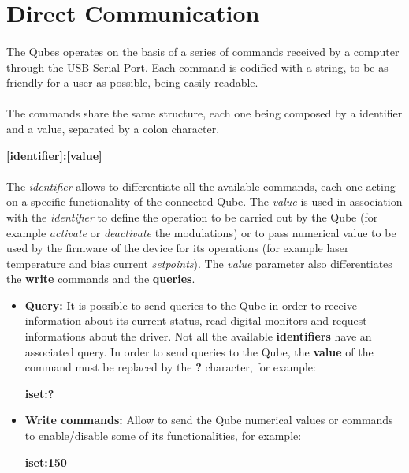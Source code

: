 \section{Direct Communication}  \label{commands_table_chapter}

\paragraph{} The Qubes operates on the basis of a series of commands received by a computer through the USB Serial Port. Each command is codified with a string, to be as friendly for a user as possible, being easily readable.

\paragraph{} The commands share the same structure, each one being composed by a identifier and a value, separated by a colon character.
\newline
    \begin{center}
        \textbf{[identifier]:[value]}
    \end{center}

\paragraph{} The \textit{identifier} allows to differentiate all the available commands, each one acting on a specific functionality of the connected Qube. The \textit{value} is used in association with the \textit{identifier} to define the operation to be carried out by the Qube (for example \textit{activate} or \textit{deactivate} the modulations) or to pass numerical value to be used by the firmware of the device for its operations (for example laser temperature and bias current \textit{setpoints}). The \textit{value} parameter also differentiates the \textbf{write} commands and the \textbf{queries}.

\begin{itemize}
    \item \textbf{Query:} It is possible to send queries to the Qube in order to receive information about its current status, read digital monitors and request informations about the driver. Not all the available \textbf{identifiers} have an associated query.
    \newline In order to send queries to the Qube, the \textbf{value} of the command must be replaced by the \textbf{?} character, for example:
        \begin{center}
            \textbf{iset:?}
        \end{center}
    \item \textbf{Write commands:} Allow to send the Qube numerical values or commands to enable/disable some of its functionalities, for example:
        \begin{center}
            \textbf{iset:150}
        \end{center}
\end{itemize}




